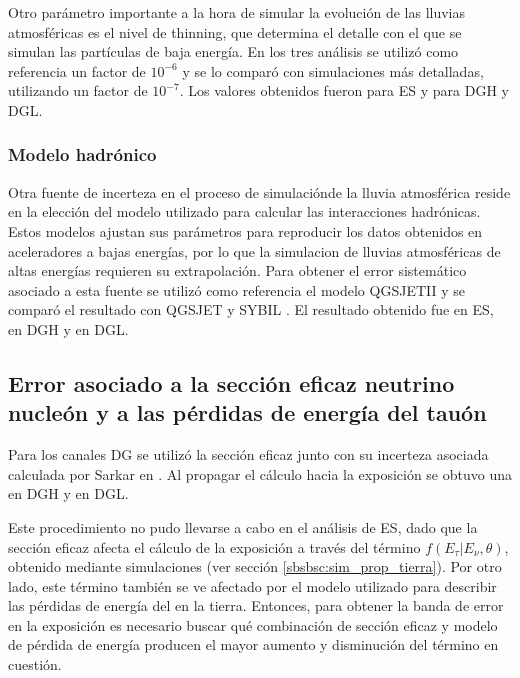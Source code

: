		Otro parámetro importante a la hora de simular la evolución de las lluvias atmosféricas es el nivel de thinning, que determina el detalle con el que se simulan las partículas de baja energía.
		En los tres análisis se utilizó como referencia un factor de $10^{-6}$ y se lo comparó con simulaciones más detalladas, utilizando un factor de $10^{-7}$.
		Los valores obtenidos fueron  para ES y  para DGH y DGL.
		
		\subsubsection{Modelo hadrónico}
		
		Otra fuente de incerteza en el proceso de simulaciónde la lluvia atmosférica reside en la elección del modelo utilizado para calcular las interacciones hadrónicas.
		Estos modelos ajustan sus parámetros para reproducir los datos obtenidos en aceleradores a bajas energías, por lo que la simulacion de lluvias atmosféricas de altas energías requieren su extrapolación.
		Para obtener el error sistemático asociado a esta fuente se utilizó como referencia el modelo QGSJETII \cite{qgsjetii} y se comparó el resultado con QGSJET \cite{qgsjet} y SYBIL \cite{sybil}.
		El resultado obtenido fue  en ES,  en DGH y  en DGL.
		
	\subsection{Error asociado a la sección eficaz neutrino nucleón y a las pérdidas de energía del tauón}
	
	Para los canales DG se utilizó la sección eficaz junto con su incerteza asociada calculada por Sarkar en \cite{cooper_sarkar}.
	Al propagar el cálculo hacia la exposición se obtuvo una  en DGH y  en DGL.
	
	Este procedimiento no pudo llevarse a cabo en el análisis de ES, dado que la sección eficaz afecta el cálculo de la exposición a través del término $f(E_\tau|E_\nu,\theta)$, obtenido mediante simulaciones (ver sección \ref{sbsbsc:sim_prop_tierra}).
	Por otro lado, este término también se ve afectado por el modelo utilizado para describir las pérdidas de energía del \tauon{} en la tierra.
	Entonces, para obtener la banda de error en la exposición es necesario buscar qué combinación de sección eficaz y modelo de pérdida de energía producen el mayor aumento y disminución del término en cuestión.
	
